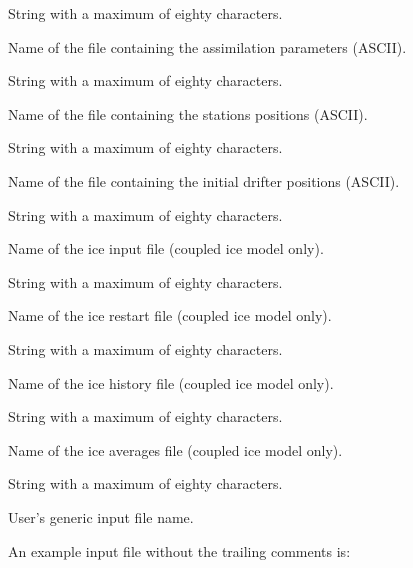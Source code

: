 \begin{klist}
     String with a maximum of eighty characters.
     \begin{klist}
         Name of the file containing the assimilation
     parameters (ASCII).
     \end{klist}
     String with a maximum of eighty characters.
     \begin{klist}
         Name of the file containing the stations
     positions (ASCII).
     \end{klist}
     String with a maximum of eighty characters.
     \begin{klist}
         Name of the file containing the initial drifter
     positions (ASCII).
     \end{klist}
     String with a maximum of eighty characters.
     \begin{klist}
         Name of the ice input file (coupled ice model
       only).
     \end{klist}
     String with a maximum of eighty characters.
     \begin{klist}
         Name of the ice restart file (coupled ice model
       only).
     \end{klist}
     String with a maximum of eighty characters.
     \begin{klist}
          Name of the ice history file (coupled ice
       model only).
     \end{klist}
     String with a maximum of eighty characters.
     \begin{klist}
          Name of the ice averages file (coupled ice
       model only).
     \end{klist}
     String with a maximum of eighty characters.
     \begin{klist}
         User's generic input file name.
     \end{klist}
\end{klist}
An example input file without the trailing comments is:
